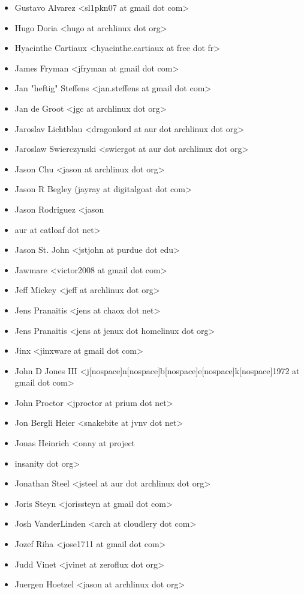 \begin{itemize}
\item  Gustavo Alvarez <sl1pkn07 at gmail dot com>
\item  Hugo Doria <hugo at archlinux dot org>
\item  Hyacinthe Cartiaux <hyacinthe.cartiaux at free dot fr>
\item  James Fryman <jfryman at gmail dot com>
\item  Jan "heftig" Steffens <jan.steffens at gmail dot com>
\item  Jan de Groot <jgc at archlinux dot org>
\item  Jaroslav Lichtblau <dragonlord at aur dot archlinux dot org>
\item  Jaroslaw Swierczynski <swiergot at aur dot archlinux dot org>
\item  Jason Chu <jason at archlinux dot org>
\item  Jason R Begley (jayray at digitalgoat dot com>
\item  Jason Rodriguez <jason\item aur at catloaf dot net>
\item  Jason St. John <jstjohn at purdue dot edu>
\item  Jawmare <victor2008 at gmail dot com>
\item  Jeff Mickey <jeff at archlinux dot org>
\item  Jens Pranaitis <jens at chaox dot net>
\item  Jens Pranaitis <jens at jenux dot homelinux dot org>
\item  Jinx <jinxware at gmail dot com>
\item  John D Jones III <j[nospace]n[nospace]b[nospace]e[nospace]k[nospace]1972 at gmail dot com>
\item  John Proctor <jproctor at prium dot net>
\item  Jon Bergli Heier <snakebite at jvnv dot net>
\item  Jonas Heinrich <onny at project\item insanity dot org>
\item  Jonathan Steel <jsteel at aur dot archlinux dot org>
\item  Joris Steyn <jorissteyn at gmail dot com>
\item  Josh VanderLinden <arch at cloudlery dot com>
\item  Jozef Riha <jose1711 at gmail dot com>
\item  Judd Vinet <jvinet at zeroflux dot org>
\item  Juergen Hoetzel <jason at archlinux dot org>

\end{itemize}
